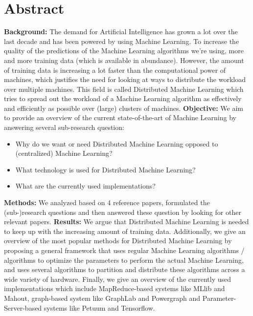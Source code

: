 \section{Abstract}
\textbf{Background:} The demand for Artificial Intelligence has grown a lot over the last decade and has been powered by using Machine Learning. To increase the quality of the predictions of the Machine Learning algorithms we're using, more and more training data (which is available in abundance). However, the amount of training data is increasing a lot faster than the computational power of machines, which justifies the need for looking at ways to distribute the workload over multiple machines. This field is called Distributed Machine Learning which tries to spread out the workload of a Machine Learning algorithm as effectively and efficiently as possible over (large) clusters of machines.
\textbf{Objective:} We aim to provide an overview of the current state-of-the-art of Machine Learning by answering several sub-research question:
\begin{itemize}
	\item Why do we want or need Distributed Machine Learning opposed to (centralized) Machine Learning?
	\item What technology is used for Distributed Machine Learning?
	\item What are the currently used implementations?
\end{itemize}
\textbf{Methods:} We analyzed based on 4 reference papers\cite{Bal12}\cite{Die12}\cite{Xing16}\cite{Zhang16}, formulated the (sub-)research questions and then answered these question by looking for other relevant papers.
\textbf{Results:} We argue that Distributed Machine Learning is needed to keep up with the increasing amount of training data. Additionally, we give an overview of the most popular methods for Distributed Machine Learning by proposing a general framework that uses regular Machine Learning algorithms / algorithms to optimize the parameters to perform the actual Machine Learning, and uses several algorithms to partition and distribute these algorithms across a wide variety of hardware. Finally, we give an overview of the currently used implementations which include MapReduce-based systems like MLlib and Mahout, graph-based system like GraphLab and Powergraph and Parameter-Server-based systems like Petuum and Tensorflow.